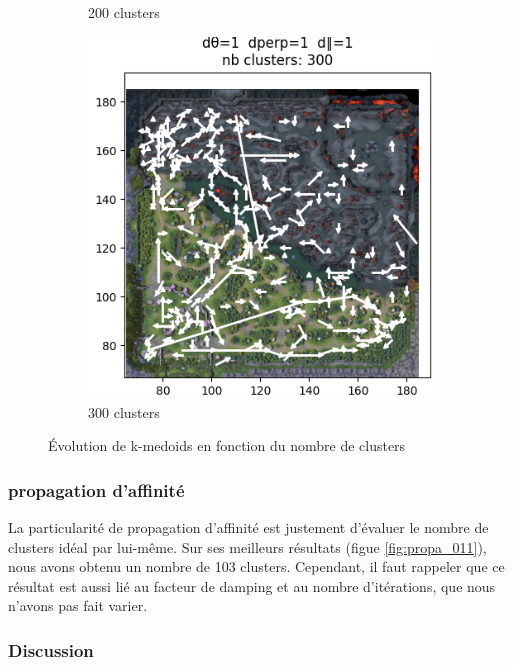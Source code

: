\begin{figure}[h!]
\begin{subfigure}[b]{0.24\textwidth}
         \caption{200 clusters}
         \label{fig:kmed_200}
     \end{subfigure}
     \hfill
     \begin{subfigure}[b]{0.24\textwidth}
         \centering
         \includegraphics[width=\textwidth]{Images/kmedoid/kmed_300.png}
         \caption{300 clusters}
         \label{fig:kmed_300}
     \end{subfigure}
     \caption{Évolution de k-medoids en fonction du nombre de clusters}
     \label{fig:kmed_nb}
\end{figure}

\subsubsection{propagation d'affinité}

La particularité de propagation d'affinité est justement d'évaluer le nombre de clusters idéal par lui-même. Sur ses meilleurs résultats (figue \ref{fig:propa_011}), nous avons obtenu un nombre de 103 clusters. Cependant, il faut rappeler que ce résultat est aussi lié au facteur de damping et au nombre d'itérations, que nous n'avons pas fait varier. 

\subsubsection{Discussion}

